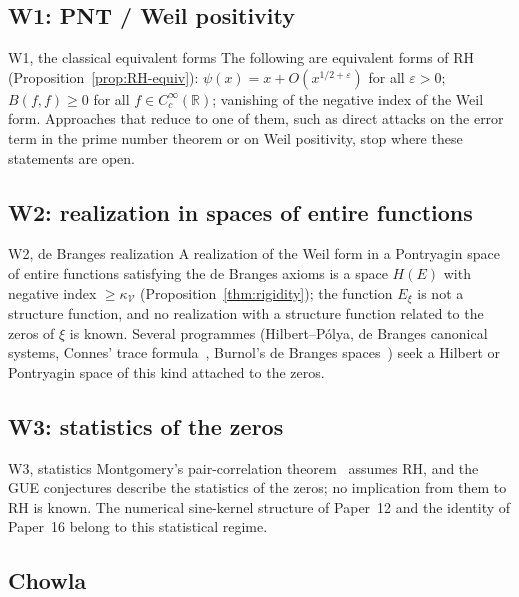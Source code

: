\documentclass[11pt]{amsart}
\theoremstyle{definition}
\theoremstyle{remark}
\newcommand{\eps}{\varepsilon}
\newcommand{\kV}{\kappa_{\mathcal V}}
\begin{document}
\subsection{W1: PNT / Weil positivity}

\begin{wallbox}{W1, the classical equivalent forms}
The following are equivalent forms of RH (Proposition~\ref{prop:RH-equiv}):
$\psi(x) = x + O(x^{1/2+\eps})$ for all $\eps>0$; $B(f,f)\ge0$ for all
$f\in C_c^\infty(\mathbb R)$; vanishing of the negative index of the Weil form.
Approaches that reduce to one of them, such as direct attacks on the error term in the
prime number theorem or on Weil positivity, stop where these statements are open.
\end{wallbox}

\subsection{W2: realization in spaces of entire functions}

\begin{wallbox}{W2, de Branges realization}
A realization of the Weil form in a Pontryagin space of entire functions satisfying the
de Branges axioms is a space $H(E)$ with negative index $\ge\kV$
(Proposition~\ref{thm:rigidity}); the function $E_\xi$ is not a structure function, and
no realization with a structure function related to the zeros of $\xi$ is known.
Several programmes (Hilbert--P\'olya, de Branges canonical systems, Connes' trace
formula~\cite{Con99}, Burnol's de Branges spaces~\cite{Bur}) seek a Hilbert or Pontryagin
space of this kind attached to the zeros.
\end{wallbox}

\subsection{W3: statistics of the zeros}

\begin{wallbox}{W3, statistics}
Montgomery's pair-correlation theorem~\cite{Mon73} assumes RH, and the GUE conjectures
describe the statistics of the zeros; no implication from them to RH is known. The
numerical sine-kernel structure of Paper~12 and the identity of Paper~16 belong to this
statistical regime.
\end{wallbox}

\subsection{Chowla}
\end{document}
